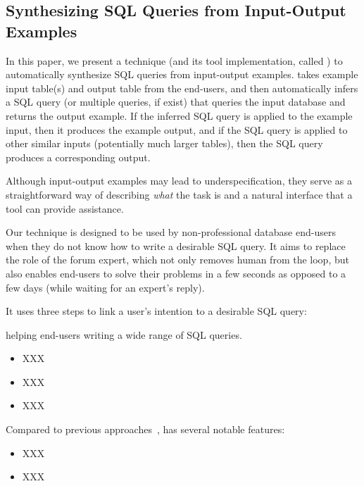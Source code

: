 \subsection{Synthesizing SQL Queries from Input-Output Examples}


In this paper, we present a technique (and its tool
implementation, called \ourtool) to automatically synthesize SQL queries
from input-output examples. \ourtool takes example input
table(s) and output table from the end-users, and then automatically
infers a SQL query (or multiple queries, if exist) that queries
the input database and returns the output example. If the inferred
SQL query is applied
to the example input, then it produces the example output, and if the
SQL query is applied to other similar inputs (potentially much larger tables),
then the SQL query produces a corresponding output.

Although
input-output examples may lead to underspecification, they
serve as a straightforward way of describing \textit{what} the
task is and a natural interface that a tool can provide assistance.

Our technique is designed to be used by non-professional
database end-users when they do not know how to write a desirable SQL query.
It aims to replace the role of the forum expert, 
which not only removes human from the loop, but also enables
end-users to solve their problems in a few seconds as opposed to a few days
(while waiting for an expert's reply). 

It uses three steps to link a user's intention to
a desirable SQL query:


helping end-users writing a wide range of SQL queries.

\begin{itemize}
\item XXX
\item XXX
\item XXX
\end{itemize}

Compared to previous approaches~\cite{}, \ourtool has several
notable features:

\begin{itemize}
\item XXX
\item XXX
\end{itemize}


